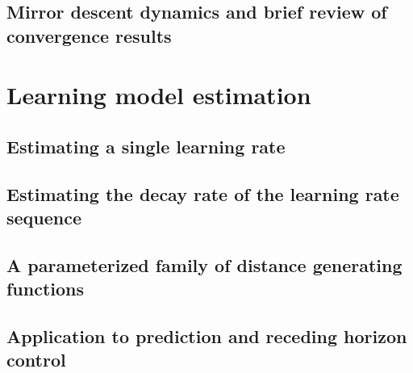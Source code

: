 \documentclass{sig-alternate-ipsn13}
\begin{document}
\subsection{Mirror descent dynamics and brief review of convergence results}

\section{Learning model estimation}
\label{sec:estimation}
\subsection{Estimating a single learning rate}



\subsection{Estimating the decay rate of the learning rate sequence}


\subsection{A parameterized family of distance generating functions}


\subsection{Application to prediction and receding horizon control}


\newpage
\end{document}
